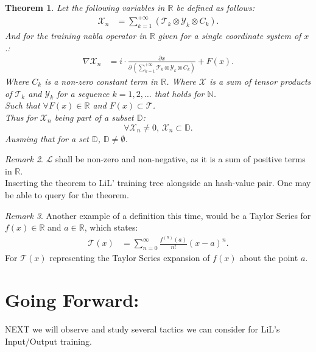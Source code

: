 \documentclass[10pt]{article}
\theoremstyle{plain}
\newtheorem{theorem}{Theorem}[section]
\theoremstyle{definition}
\theoremstyle{remark}
\newtheorem{remark}[theorem]{Remark}
\begin{document}
\begin{theorem}
Let the following variables in $\mathbb{R}$ be defined as follows:
\begin{align*}
    \mathcal{X}_n &= \sum_{k=1}^{+\infty} (\mathcal{T}_k \otimes \mathcal{Y}_k \otimes C_k).
\end{align*}
And for the training nabla operator in $\mathbb{R}$ given for a single coordinate system of $x$.:
\begin{align*}
	\nabla \mathcal{X}_n &= i \cdot \frac{\partial x}{\partial \, (\sum_{k=1}^{+\infty} \mathcal{T}_k \otimes \mathcal{Y}_k \otimes C_k)} + F(x).
\end{align*}
Where $C_k$ is a non-zero constant term in $\mathbb{R}$. Where $\mathcal{X}$ is a sum of tensor products of $\mathcal{T}_k$ and $\mathcal{Y}_k$ for a sequence $k=1, 2, \ldots$ that holds for $\mathbb{N}$.\\
Such that $\forall F(x) \in \mathbb{R}$ and $F(x) \subset \mathcal{T}$.\\
Thus for $\mathcal{X}_n$ being part of a subset $\mathbb{D}$:
\begin{equation}
	\forall \mathcal{X}_n \neq 0, \, \mathcal{X}_n \subset \mathbb{D}.
\end{equation}
Ausming that for a set $\mathbb{D}$, $\mathbb{D} \neq \emptyset$.
\end{theorem}

\begin{remark}
    $\mathcal{L}$ shall be non-zero and non-negative, as it is a sum of positive terms in $\mathbb{R}$.\\
	Inserting the theorem to LiL' training tree alongside an hash-value pair. One may be able to query for the theorem.
\end{remark}

\begin{remark}
	Another example of a definition this time, would be a Taylor Series for $f(x) \in \mathbb{R}$ and $a \in \mathbb{R}$, which states:
	\begin{align*}
		\mathcal{T}(x) &= \sum_{n=0}^{\infty} \frac{f^{(n)}(a)}{n!} (x-a)^n.
	\end{align*}
	For $\mathcal{T}(x)$ representing the Taylor Series expansion of $f(x)$ about the point $a$.
\end{remark}

\section{Going Forward:}

\lettrine[lines=1, lhang=0.1, loversize=0.2]{N}EXT we will observe and study several tactics we can consider for LiL's Input/Output training.

\nocite{*}



\end{document}
